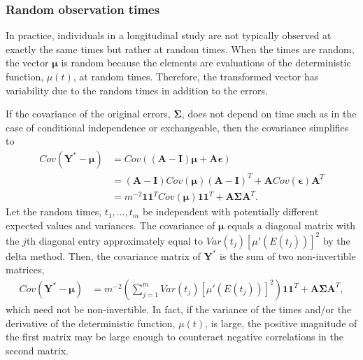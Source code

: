 \documentclass[12pt]{article}
\newcommand{\B}[0]{\mathbf}
\newcommand{\BS}[0]{\boldsymbol}
\begin{document}
\subsubsection{Random observation times} 
In practice, individuals in a longitudinal study are not typically observed at exactly the same times but rather at random times. When the times are random, the vector $\BS\mu$ is random because the elements are evaluations of the deterministic function, $\mu(t)$, at random times. Therefore, the transformed vector has variability due to the random times in addition to the errors. 

If the covariance of the original errors, $\BS \Sigma$, does not depend on time such as in the case of conditional independence or exchangeable, then the covariance simplifies to
\begin{align*}
Cov(\B Y^{*} - \BS\mu) &= Cov((\B A-\B I)\BS\mu + \B A \BS\epsilon)\\
&=(\B A-\B I) Cov(\BS\mu)(\B A-\B I)^{T} + \B A Cov(\BS\epsilon)\B A^{T}\\
&=m^{-2}\B 1\B 1^{T} Cov(\BS\mu)\B 1\B 1^{T} + \B A\BS\Sigma\B A^{T}.
\end{align*}
Let the random times, $t_{1},...,t_{m}$ be independent with potentially different expected values and variances. The covariance of $\BS\mu$ equals a diagonal matrix with the $j$th diagonal entry approximately equal to $Var(t_{j})[\mu'(E(t_{j}))]^{2}$ by the delta method. Then, the covariance matrix of $\B Y^{*}$ is the sum of two non-invertible matrices,
\begin{align*}
Cov(\B Y^{*} - \BS\mu) &=m^{-2}\left(\sum^{m}_{j=1}Var(t_{j})[\mu'(E(t_{j}))]^{2}\right) \B 1\B 1^{T}  + \B A\BS\Sigma\B A^{T},
\end{align*}
which need not be non-invertible. In fact, if the variance of the times and/or the derivative of the deterministic function, $\mu(t)$, is large, the positive magnitude of the first matrix may be large enough to counteract negative correlations in the second matrix. 
\end{document}
